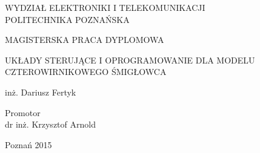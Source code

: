 \documentclass[11pt, twoside]{Thesis} %
\begin{document}
\begin{titlepage}

\begin{center}
	\fontsize{14pt}{14pt}\selectfont
	WYDZIAŁ ELEKTRONIKI I TELEKOMUNIKACJI \\
	POLITECHNIKA POZNAŃSKA \\
	\vspace*{.6\baselineskip}

	\vspace*{8\baselineskip}
	\fontsize{12pt}{12pt}\selectfont
	MAGISTERSKA PRACA DYPLOMOWA\\
	\vspace*{1.15\baselineskip}

	\fontsize{18pt}{18pt}\selectfont
	UKŁADY STERUJĄCE I OPROGRAMOWANIE DLA MODELU CZTEROWIRNIKOWEGO ŚMIGŁOWCA \\
	\vspace*{0.2\baselineskip}

	\fontsize{14pt}{14pt}\selectfont
	inż. Dariusz Fertyk\\
	\vspace*{1.15\baselineskip}
		\end{center}

	\vspace*{8.5\baselineskip}
	\begin{flushright}
	\fontsize{12pt}{10pt}\selectfont
	Promotor\\
	dr inż. Krzysztof Arnold\\
	\end{flushright}

	\vspace*{6\baselineskip}
	\begin{center}
	Poznań 2015
	\end{center}



 

\end{titlepage}
\end{document}
